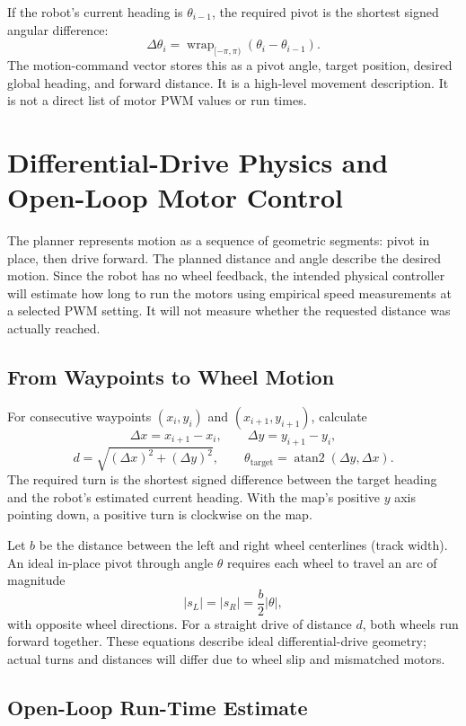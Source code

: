 \documentclass{article}
\begin{document}
If the robot's current heading is $\theta_{i-1}$, the required pivot is the shortest signed angular difference:
\[
\Delta\theta_i=
\operatorname{wrap}_{[-\pi,\pi)}
(\theta_i-\theta_{i-1}).
\]
The motion-command vector stores this as a pivot angle, target position, desired global heading, and forward distance. It is a high-level movement description. It is not a direct list of motor PWM values or run times.

\section{Differential-Drive Physics and Open-Loop Motor Control}

The planner represents motion as a sequence of geometric segments: pivot in place, then drive forward. The planned distance and angle describe the desired motion. Since the robot has no wheel feedback, the intended physical controller will estimate how long to run the motors using empirical speed measurements at a selected PWM setting. It will not measure whether the requested distance was actually reached.

\subsection{From Waypoints to Wheel Motion}

For consecutive waypoints $(x_i,y_i)$ and $(x_{i+1},y_{i+1})$, calculate
\[
\Delta x=x_{i+1}-x_i,\qquad \Delta y=y_{i+1}-y_i,
\]
\[
d=\sqrt{(\Delta x)^2+(\Delta y)^2},\qquad
\theta_{\mathrm{target}}=\operatorname{atan2}(\Delta y,\Delta x).
\]
The required turn is the shortest signed difference between the target heading and the robot's estimated current heading. With the map's positive $y$ axis pointing down, a positive turn is clockwise on the map.

Let $b$ be the distance between the left and right wheel centerlines (track width). An ideal in-place pivot through angle $\theta$ requires each wheel to travel an arc of magnitude
\[
|s_L|=|s_R|=\frac{b}{2}|\theta|,
\]
with opposite wheel directions. For a straight drive of distance $d$, both wheels run forward together. These equations describe ideal differential-drive geometry; actual turns and distances will differ due to wheel slip and mismatched motors.

\subsection{Open-Loop Run-Time Estimate}
\end{document}
